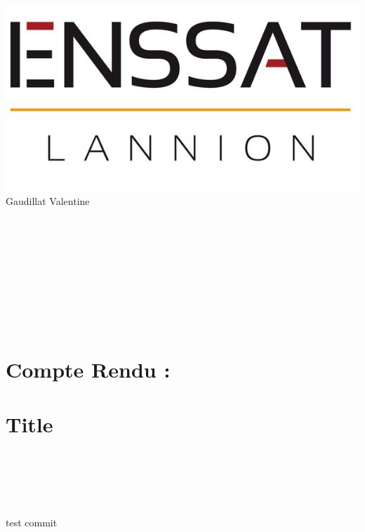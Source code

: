 \documentclass[a4paper,12pt,titlepage]{article}
\begin{document}
	
		
	 
	{\hfill \includegraphics[scale=0.15]{LogoENSSAT.jpg}}\\
	Gaudillat Valentine \\ 

    
    
	\begin{verbatim}
	
	
	
	
	
	

	

	\end{verbatim}
	{\centering \section*{Compte Rendu :} \section*{Title}}
	\begin{verbatim}
	
	
	
	
	\end{verbatim}
	
	\begin{center}
	\end{center}
		
		
		
		
		
		
		
		
		
		
		
		
	
	\clearpage
	\tableofcontents 
	\newpage

test commit
\end{document}
